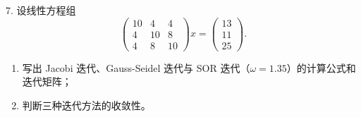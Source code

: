 \documentclass[11pt, a4paper]{ctexart}
\begin{document}
\begin{problem}{7. 设线性方程组}
    \[
        \begin{pmatrix}
            10 & 4 & 4 \\
            4 & 10 & 8 \\
            4 & 8 & 10
        \end{pmatrix}
        x
        =
        \begin{pmatrix}
            13 \\
            11 \\
            25
        \end{pmatrix}.
    \]
    \begin{enumerate}[1.]
        \item 写出 Jacobi 迭代、Gauss-Seidel 迭代与 SOR 迭代（$\omega = 1.35$）的计算公式和迭代矩阵；
        \item 判断三种迭代方法的收敛性。
    \end{enumerate}
\end{problem}
\end{document}
